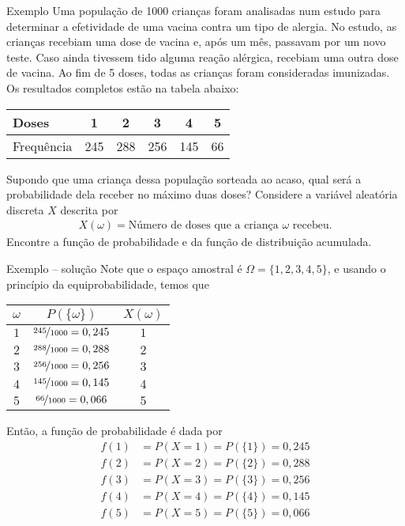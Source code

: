 \documentclass[9pt]{beamer}
\begin{document}
\begin{frame}{Exemplo}
Uma população de 1000 crianças foram analisadas num estudo para determinar a efetividade de uma vacina contra um tipo de alergia. No estudo, as crianças recebiam uma dose de vacina e, após um mês, passavam por um novo teste. Caso ainda tivessem tido alguma reação alérgica, recebiam uma outra dose de vacina. Ao fim de 5 doses, todas as crianças foram consideradas imunizadas. Os resultados completos estão na tabela abaixo:
\begin{table}[ht]
	\centering
	\begin{tabular}{l|c|c|c|c|c}
		\toprule[0.05cm]
		Doses & 1 & 2 & 3 & 4 & 5 \\ 
		\midrule[0.05cm]
		Frequência & 245 & 288 & 256 & 145 & 66 \\ 
		\bottomrule[0.05cm]
	\end{tabular}
\end{table}
Supondo que uma criança dessa população sorteada ao acaso, qual será a probabilidade dela receber no máximo duas doses? Considere a variável aleatória discreta $X$ descrita por
\begin{align*}
X(\omega) = \mbox{Número de doses que a criança } \omega \mbox{ recebeu.}
\end{align*}
Encontre a função de probabilidade e da função de distribuição acumulada.
\end{frame}

\begin{frame}{Exemplo -- solução}
 Note que o espaço amostral é $\Omega = \{1,2,3,4,5\}$, e usando o princípio da equiprobabilidade, temos que
 \begin{table}
  \centering
  \begin{tabular}{ccc}
  \toprule[0.05cm]
    $\omega$ & $P(\{\omega\})$ & $X(\omega)$\\ \midrule[0.05cm]
    $1$ & $\nicefrac{245}{1000}=0,245$ & $1$\\
    $2$ & $\nicefrac{288}{1000}=0,288$ & $2$\\
    $3$ & $\nicefrac{256}{1000}=0,256$ & $3$\\
    $4$ & $\nicefrac{145}{1000}=0,145$ & $4$\\
    $5$ & $\nicefrac{66}{1000}=0,066$ & $5$\\ \bottomrule[0.05cm]
  \end{tabular}
 \end{table}
Então, a função de probabilidade é dada por
\begin{align*}
 f(1) &= P(X=1) = P(\{1\}) = 0,245\\
 f(2) &= P(X=2) = P(\{2\}) = 0,288\\
 f(3) &= P(X=3) = P(\{3\}) = 0,256\\
 f(4) &= P(X=4) = P(\{4\}) = 0,145\\
 f(5) &= P(X=5) = P(\{5\}) = 0,066\\
\end{align*}

\end{frame}
\end{document}
